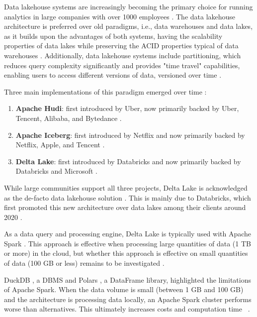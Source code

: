 Data lakehouse systems are increasingly becoming the primary choice for running analytics in large companies with over 1000 employees \cite{StateDataLakehouse2024}. The data lakehouse architecture \cite{lakehouse2021} is preferred over old paradigms, i.e., data warehouses and data lakes, as it builds upon the advantages of both systems, having the scalability properties of data lakes while preserving the \gls{ACID} properties typical of data warehouses \cite{lakehouse2021}. Additionally, data lakehouse systems include partitioning, which reduces query complexity significantly and provides "time travel" capabilities, enabling users to access different versions of data, versioned over time \cite{crociDataLakehouseHype2022}.

Three main implementations of this paradigm emerged over time \cite{ApacheHudiVs}: 
\begin{enumerate}
    \item \textbf{Apache Hudi}: first introduced by Uber, now primarily backed by Uber, Tencent, Alibaba, and Bytedance \cite{rajaperumalUberEngineeringIncremental2017}.
    \item \textbf{Apache Iceberg}: first introduced by Netflix and now primarily backed by Netflix, Apple, and Tencent \cite{ApacheIcebergApache}.
    \item \textbf{Delta Lake}: first introduced by Databricks and now primarily backed by Databricks and Microsoft \cite{armbrustDeltaLakeHighperformance2020}.
\end{enumerate}

While large communities support all three projects, Delta Lake is acknowledged as the de-facto data lakehouse solution \cite{ApacheHudiVs}. This is mainly due to Databricks, which first promoted this new architecture over data lakes among their clients around 2020 \cite{armbrustDeltaLakeHighperformance2020}.

As a data query and processing engine, Delta Lake is typically used with Apache Spark \cite{zahariaApacheSparkUnified2016}. This approach is effective when processing large quantities of data (1 TB or more) in the cloud, but whether this approach is effective on small quantities of data (100 GB or less) remains to be investigated \cite{Khazanchi1801362}.

DuckDB \cite{raasveldtDuckDBEmbeddableAnalytical2019}, a \gls{DBMS} and Polars \cite{vinkWroteOneFastest2021}, a DataFrame library, highlighted the limitations of Apache Spark. When the data volume is small (between 1 GB and 100 GB) and the architecture is processing data locally, an Apache Spark cluster performs worse than alternatives. This ultimately increases costs and computation time ~\cite{BenchmarkResultsSpark,ebergenUpdatesH2OAi2023}.

